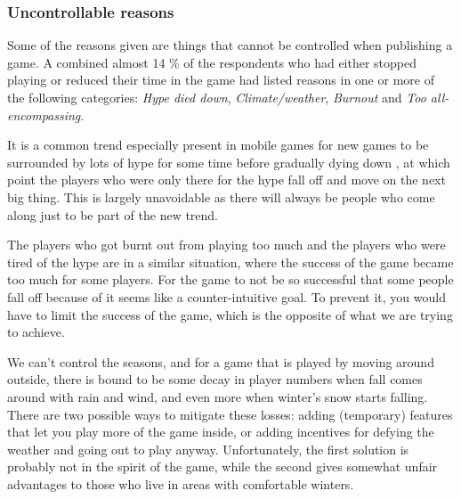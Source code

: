 \subsubsection{Uncontrollable reasons}
Some of the reasons given are things that cannot be controlled when publishing a game. A combined almost 14 \% of the respondents who had either stopped playing or reduced their time in the game had listed reasons in one or more of the following categories: \emph{Hype died down}, \emph{Climate/weather}, \emph{Burnout} and \emph{Too all-encompassing}.

It is a common trend especially present in mobile games for new games to be surrounded by lots of hype  for some time before gradually dying down , at which point the players who were only there for the hype fall off and move on the next big thing. This is largely unavoidable as there will always be people who come along just to be part of the new trend.

The players who got burnt out from playing too much and the players who were tired of the hype are in a similar situation, where the success of the game became too much for some players. For the game to not be so successful that some people fall off because of it seems like a counter-intuitive goal. To prevent it, you would have to limit the success of the game, which is the opposite of what we are trying to achieve.

We can't control the seasons, and for a game that is played by moving around outside, there is bound to be some decay in player numbers when fall comes around with rain and wind, and even more when winter's snow starts falling. There are two possible ways to mitigate these losses: adding (temporary) features that let you play more of the game inside, or adding incentives for defying the weather and going out to play anyway. Unfortunately, the first solution is probably not in the spirit of the game, while the second gives somewhat unfair advantages to those who live in areas with comfortable winters. 
